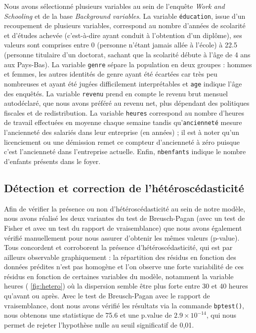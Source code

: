 \documentclass[a4paper, french, 11 pt]{article}\usepackage[]{graphicx}\usepackage[]{xcolor}
\begin{document}
Nous avons sélectionné plusieurs variables au sein de l’enquête \textit{Work and Schooling} et de la base \textit{Background variables}. La variable \verb+éducation+, issue d’un recoupement de plusieurs variables, correspond au nombre d’années de scolarité et d’études achevée (c’est-à-dire ayant conduit à l’obtention d’un diplôme), ses valeurs sont comprises entre 0 (personne n’étant jamais allée à l’école) à 22.5 (personne titulaire d’un doctorat, sachant que la scolarité débute à l’âge de 4 ans aux Pays-Bas). La variable \verb+genre+ sépare la population en deux groupes : hommes et femmes, les autres identités de genre ayant été écartées car très peu nombreuses et ayant été jugées difficilement interprétables et \verb+age+ indique l’âge des enquêtés. La variable \verb+revenu+ prend en compte le revenu brut mensuel autodéclaré, que nous avons préféré au revenu net, plus dépendant des politiques fiscales et de redistribution. La variable \verb+heures+ correspond au nombre d’heures de travail effectuées en moyenne chaque semaine tandis qu’\verb+ancienneté+ mesure l’ancienneté des salariés dans leur entreprise (en années) ; il est à noter qu’un licenciement ou une démission remet ce compteur d’ancienneté à zéro puisque c’est l’ancienneté dans l’entreprise actuelle. Enfin, \verb+nbenfants+ indique le nombre d’enfants présents dans le foyer. 

\subsection{Détection et correction de l’hétéroscédasticité}





Afin de vérifier la présence ou non d’hétéroscédasticité au sein de notre modèle, nous avons réalisé les deux variantes du test de Breusch-Pagan (avec un test de Fisher et avec un test du rapport de vraisemblance) que nous avons également vérifié manuellement pour nous assurer d’obtenir les mêmes valeurs (p-value). Tous concordent et corroborent la présence d’hétéroscédasticité, qui est par ailleurs observable graphiquement : la répartition des résidus en fonction des données prédites n’est pas homogène et l’on observe une forte variabilité de ces résidus en fonction de certaines variables du modèle, notamment la variable heures ( \ref{fig:hetero}) où la dispersion semble être plus forte entre 30 et 40 heures qu’avant ou après. Avec le test de Breusch-Pagan avec le rapport de vraisemblance, dont nous avons vérifié les résultats via la commande \verb+bptest()+, nous obtenons une statistique de 75.6 et une p.value de \ensuremath{2.9\times 10^{-14}}, qui nous permet de rejeter l’hypothèse nulle au seuil significatif de 0,01. 
\end{document}
